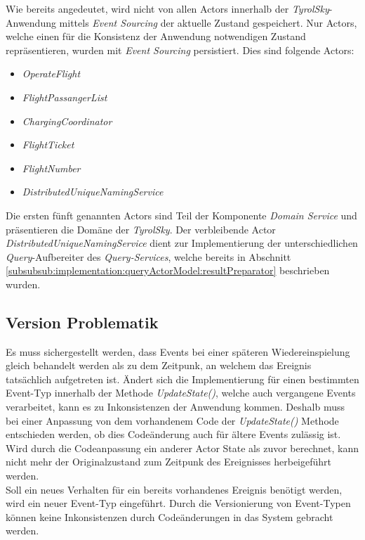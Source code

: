 Wie bereits angedeutet, wird nicht von allen Actors innerhalb der \textit{TyrolSky}-Anwendung mittels \textit{Event Sourcing} der aktuelle Zustand gespeichert. Nur Actors, welche einen für die Konsistenz der Anwendung notwendigen Zustand repräsentieren, wurden mit \textit{Event Sourcing} persistiert. Dies sind folgende Actors: 
\begin{itemize}
  \item{\textit{OperateFlight}}
  \item{\textit{FlightPassangerList}}
  \item{\textit{ChargingCoordinator}}
  \item{\textit{FlightTicket}}
  \item{\textit{FlightNumber}}
  \item{\textit{DistributedUniqueNamingService}}
\end{itemize}
Die ersten fünft genannten Actors sind Teil der Komponente \textit{Domain Service} und präsentieren die Domäne der \textit{TyrolSky}. Der verbleibende Actor \textit{DistributedUniqueNamingService} dient zur Implementierung der unterschiedlichen \textit{Query}-Aufbereiter des \textit{Query-Services}, welche bereits in Abschnitt \ref{subsubsub:implementation:queryActorModel:resultPreparator} beschrieben wurden.

\subsection{Version Problematik}
Es muss sichergestellt werden, dass Events bei einer späteren Wiedereinspielung gleich behandelt werden als zu dem Zeitpunk, an welchem das Ereignis tatsächlich aufgetreten ist. Ändert sich die Implementierung für einen bestimmten Event-Typ innerhalb der Methode \textit{UpdateState()}, welche auch vergangene Events verarbeitet, kann es zu Inkonsistenzen der Anwendung kommen. Deshalb muss bei einer Anpassung von dem vorhandenem Code der \textit{UpdateState()} Methode entschieden werden, ob dies Codeänderung auch für ältere Events zulässig ist. Wird durch die Codeanpassung ein anderer Actor State als zuvor berechnet, kann nicht mehr der Originalzustand zum Zeitpunk des Ereignisses herbeigeführt werden. \\
Soll ein neues Verhalten für ein bereits vorhandenes Ereignis benötigt werden, wird ein neuer Event-Typ eingeführt. Durch die Versionierung von Event-Typen können keine Inkonsistenzen durch Codeänderungen in das System gebracht werden. 
